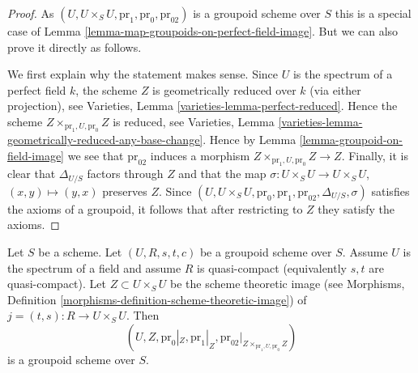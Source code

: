 \begin{proof}
As $(U, U \times_S U, \text{pr}_1, \text{pr}_0, \text{pr}_{02})$
is a groupoid scheme over $S$ this is a special case of
Lemma \ref{lemma-map-groupoids-on-perfect-field-image}.
But we can also prove it directly as follows.

\medskip\noindent
We first explain why the statement makes sense. Since $U$ is the spectrum
of a perfect field $k$, the scheme $Z$ is geometrically reduced
over $k$ (via either projection), see
Varieties, Lemma \ref{varieties-lemma-perfect-reduced}.
Hence the scheme $Z \times_{\text{pr}_1, U, \text{pr}_0} Z$
is reduced, see
Varieties, Lemma \ref{varieties-lemma-geometrically-reduced-any-base-change}.
Hence by
Lemma \ref{lemma-groupoid-on-field-image}
we see that $\text{pr}_{02}$ induces a morphism
$Z \times_{\text{pr}_1, U, \text{pr}_0} Z \to Z$.
Finally, it is clear that $\Delta_{U/S}$ factors through $Z$
and that the map
$\sigma : U \times_S U \to U \times_S U$, $(x, y) \mapsto (y, x)$
preserves $Z$. Since
$(U, U \times_S U, \text{pr}_0, \text{pr}_1, \text{pr}_{02},
\Delta_{U/S}, \sigma)$
satisfies the axioms of a groupoid, it follows that after restricting
to $Z$ they satisfy the axioms.
\end{proof}

\begin{lemma}
\label{lemma-quasi-compact-groupoid-on-field-image}
Let $S$ be a scheme. Let $(U, R, s, t, c)$ be a groupoid scheme
over $S$. Assume $U$ is the spectrum of a field and
assume $R$ is quasi-compact (equivalently $s, t$ are quasi-compact).
Let $Z \subset U \times_S U$ be the scheme theoretic image (see
Morphisms, Definition \ref{morphisms-definition-scheme-theoretic-image})
of $j = (t, s) : R \to U \times_S U$.
Then
$$
(U, Z, \text{pr}_0|_Z, \text{pr}_1|_Z,
\text{pr}_{02}|_{Z \times_{\text{pr}_1, U, \text{pr}_0} Z})
$$
is a groupoid scheme over $S$.
\end{lemma}

